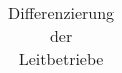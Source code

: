 \begin{table}
  \centering
  \caption{Differenzierung der Leitbetriebe}
  \label{table:Differenzierung}
  \begin{tabular}{|l|l|}
    \hline
			


  \end{tabular}
\end{table}
